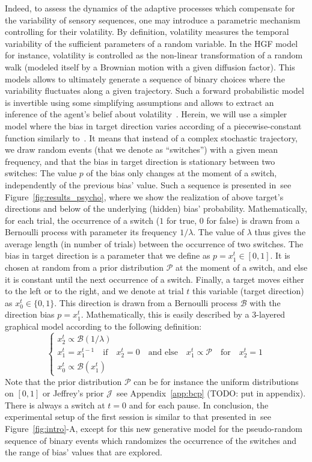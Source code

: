 \documentclass[profile,final,english, draft]{article}%
\newcommand{\choice}[1]{ %
	\left\{ %
		\begin{array}{l} #1 \end{array} %
	\right. }
\newcommand{\eql}[1]{\begin{equation}#1\end{equation}}
\newcommand{\Bb}{\mathcal{B}}
\newcommand{\Jj}{\mathcal{J}}
\newcommand{\Pp}{\mathcal{P}}
\newcommand{\citep}[1]{\parencite{#1}}
\newcommand{\citet}[1]{\textcite{#1}}
\newcommand{\seeFig}[1]{see Figure~\ref{fig:#1}}
\newcommand{\seeApp}[1]{see Appendix~\ref{app:#1}}
\begin{document}
Indeed, to assess the dynamics of the adaptive processes
which compensate for the variability of sensory sequences,
one may introduce a parametric mechanism controlling for their volatility.
By definition, volatility measures the temporal variability
of the sufficient parameters of a random variable.
In the HGF model~\citep{Matthys2011} for instance,
volatility is controlled as the non-linear transformation
of a random walk (modeled itself by a Brownian motion with a given diffusion factor).
This models allows to ultimately generate a sequence of binary choices
where the variability fluctuates along a given trajectory.
Such a forward probabilistic model is invertible
using some simplifying assumptions and allows
to extract an inference of the agent's belief about volatility~\citep{Voessel??}.
Herein, we will use a simpler model where
the bias in target direction varies according of a piecewise-constant function
similarly to~\citet{Meyniel13}.
It means that instead of a complex stochastic trajectory, 
we draw random events (that we denote as ``switches'')
with a given mean frequency,
and that the bias in target direction is stationary between two switches:
The value $p$ of the bias only changes at the moment of a switch,
independently of the previous bias' value.
Such a sequence is presented in~\seeFig{results_psycho},
where we show the realization of above target's directions and
below of the underlying (hidden) bias' probability.
Mathematically, for each trial, 
the occurrence of a switch ($1$ for true, $0$ for false)
is  drawn from a Bernoulli process with parameter its frequency $1/\lambda$.
The value of $\lambda$ thus gives the average length (in number of trials) 
between the occurrence of two switches.
The bias in target direction is a parameter that we define as $p=x_1^t \in [0, 1]$.
It is chosen at random from a prior distribution $\Pp$ at the moment of a switch,
and else it is constant until the next occurrence of a switch.
Finally, a target moves either to the left or to the right,
and we denote at trial $t$ this variable (target direction) as $x_0^t\in \{ 0, 1 \}$.
This direction is drawn from a Bernoulli process $\Bb$
with the direction bias $p=x_1^t$.
Mathematically, this is easily described
by a 3-layered graphical model according to %
the following definition:
\eql{\choice{
x_2^t \propto \Bb(1/\lambda) \\
x_1^t = x_1^{t-1} \quad \text{if} \quad x_2^t=0 \quad \text{and else} \quad x_1^t \propto \Pp \quad \text{for} \quad x_2^t=1 \\
x_0^t \propto \Bb(x_1^t)
}\label{eq:sgm}}
Note that the prior distribution $\Pp$ can be for instance
the uniform distributions on $ [ 0, 1 ] $ or
Jeffrey's prior $\Jj$~\seeApp{bcp} (TODO: put in appendix).
There is always a switch at $t=0$ and for each pause.
In conclusion, the experimental setup of the first session
is similar to that presented in~\seeFig{intro}-A, except for
this new generative model for the pseudo-random sequence of binary events
which randomizes the occurrence of the switches
and the range of bias' values that are explored.
\end{document}
